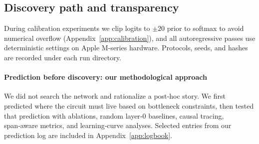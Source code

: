 \subsection{Discovery path and transparency}
During calibration experiments we clip logits to $\pm 20$ prior to softmax to avoid numerical overflow (Appendix~\ref{app:calibration}), and all autoregressive passes use deterministic settings on Apple M-series hardware. Protocols, seeds, and hashes are recorded under each run directory.

\paragraph{Prediction before discovery: our methodological approach}
We did not search the network and rationalize a post‑hoc story. We first predicted where the circuit must live based on bottleneck constraints, then tested that prediction with ablations, random layer‑0 baselines, causal tracing, span‑aware metrics, and learning‑curve analyses. Selected entries from our prediction log are included in Appendix~\ref{app:logbook}.
